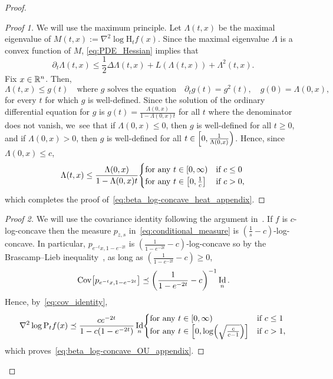 \documentclass[AHL,Unicode,longabstracts]{cedram}
\newcommand{\R}{\mathbb R}
\DeclareMathOperator{\Id}{Id}
\DeclareMathOperator{\Cov}{Cov}
\newcommand{\Pheat}{\mathrm{P}}
\newcommand{\Hheat}{\mathrm{H}}
\newcommand{\dd}{n}
\newcommand{\conv}{c}
\newcommand{\density}{f}
\let\originalleft\left
\let\originalright\right
\renewcommand{\left}{\mathopen{}\mathclose\bgroup\originalleft}
\renewcommand{\right}{\aftergroup\egroup\originalright}
\let\oldin\in
\renewcommand{\in}{\mathchoice{\oldin}{\oldin}{\,\oldin\,}{\,\oldin\,}}
\newcommand*{\MK}{\mkern 2mu}
\begin{document}
\begin{proof}
\begin{proofc}[{Proofs of Proposition~\ref{prop:OU_smooth_appendix}$\MK$\eqref{propA.2.2}}]
\begin{proof}[{Proof 1}]
We will use the maximum principle. Let $\Lambda(t,x)$ be the maximal eigenvalue of $M(t,x):=\nabla^2\log\Hheat_t\density(x)$. Since the maximal eigenvalue $\Lambda$ is a convex function of $M$, \eqref{eq:PDE_Hessian} implies that
\begin{equation}
\partial_t\Lambda(t,x)\le \frac{1}{2}\Delta \Lambda(t,x)+L(\Lambda(t,x))+\Lambda^2(t,x).
\end{equation}
Fix $x\in \R^{\dd}$. Then,
\begin{equation*}
\Lambda(t,x)\le g(t)\quad\text{where $g$ solves the equation} \quad \partial_tg(t)=g^2(t),\quad g(0)=\Lambda(0,x),
\end{equation*}
for every $t$ for which $g$ is well-defined. Since the solution of the ordinary differential equation for $g$ is $g(t)=\frac{\Lambda(0,x)}{1-\Lambda(0,x)t}$ for all $t$ where the denominator does not vanish, we~see that if $\Lambda(0,x)\le 0$, then $g$ is well-defined for all $t\ge 0$, and if $\Lambda(0,x)> 0$, then $g$ is well-defined for all $t\in \left[0,\frac{1}{\Lambda(0,x)}\right)$. Hence, since $\Lambda(0,x)\le \conv$,
\begin{equation*}
\Lambda(t,x)\le\frac{\Lambda(0,x)}{1-\Lambda(0,x)t}
\begin{cases}
\text{for any }t\in [0,\infty) &\text{if }\conv\le 0\\
\text{for any }t\in \left[0,\frac{1}{\conv}\right] &\text{if }\conv >0,
\end{cases}
\end{equation*}
which completes the proof of~\eqref{eq:beta_log-concave_heat_appendix}.\let\qed\relax
\end{proof}

\begin{proof}[{Proof 2}]
We will use the covariance identity following the argument in~\cite[Lemma~3.4$\MK$(2)]{MR4797372}. If $\density$ is $\conv$-log-concave then the measure $p_{z,s}$ in~\eqref{eq:conditional_measure} is $(\frac{1}{s}-\conv)$-log-concave. In particular, $p_{e^{-t}x,1-e^{-2t}}$ is $(\frac{1}{1-e^{-2t}}-\conv)$-log-concave so by the Brascamp--Lieb inequality~\cite{MR450480}, as long as $(\frac{1}{1-e^{-2t}}-\conv)\ge 0$,
\[
\Cov\left[p_{e^{-t}x,1-e^{-2t}}\right] \preceq \left(\frac{1}{1-e^{-2t}}-\conv\right)^{-1}\Id_{\dd}.
\]
Hence, by~\eqref{eq:cov_identity},
\begin{equation*}
\nabla^2\log\Pheat_t\density(x)\preceq \frac{\conv e^{-2t}}{1-\conv(1-e^{-2t})} \Id_{\dd}
\begin{cases}
\text{for any }t\in [0,\infty) &\text{if }\conv\le 1\\
\text{for any }t\in \left[0,\log\left(\sqrt{\frac{\conv}{\conv-1}}\right)\right] &\text{if }\conv >1,
\end{cases}
\end{equation*}
which proves~\eqref{eq:beta_log-concave_OU_appendix}.\let\qed\relax
\end{proof}


\end{proofc}
\end{proof}
\end{document}
